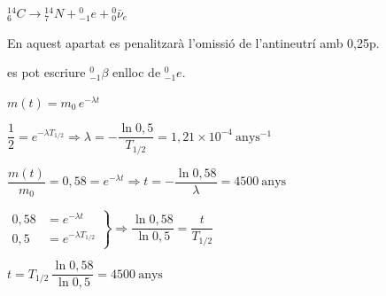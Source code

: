 \begin{solapartat}
 ${}^{14}_{6}C \rightarrow {}^{14}_{7}N + {}^{0}_{-1}e + {}^{0}_{0}\bar{\nu}_e$

En aquest apartat es penalitzarà l'omissió de l'antineutrí amb 0,25p.

 es pot escriure ${}^{0}_{-1}\beta$ enlloc de ${}^{0}_{-1}e$.
\end{solapartat}

\begin{solapartat}
 $m(t) = m_0\,e^{-\lambda t}$

 $\dfrac{1}{2} = e^{-\lambda T_{1/2}} \Longrightarrow \lambda = -\dfrac{\ln 0,5}{T_{1/2}} = 1,21\times 10^{-4}\ \mathrm{anys^{-1}}$

 $\dfrac{m(t)}{m_0} = 0,58 = e^{-\lambda t} \Longrightarrow t = -\dfrac{\ln 0,58}{\lambda} = 4500\ \mathrm{anys}$

\medskip
{}

 $\left.\begin{aligned} 0,58 &= e^{-\lambda t}\\ 0,5 &= e^{-\lambda T_{1/2}} \end{aligned}\right\} \Longrightarrow \dfrac{\ln 0,58}{\ln 0,5} = \dfrac{t}{T_{1/2}}$

 $t = T_{1/2}\,\dfrac{\ln 0,58}{\ln 0,5} = 4500\ \mathrm{anys}$
\end{solapartat}
